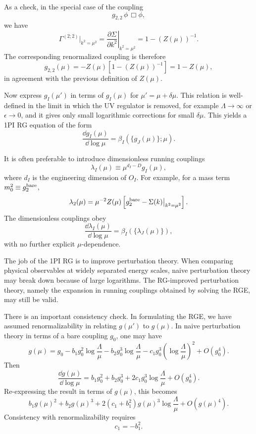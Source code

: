 As a check, in the special case of the coupling
\[
  g_{2,2}\,\phi\,\Box\phi,
\]
we have
\[
  \Gamma^{(2;2)}\big|_{k^2=\mu^2}
  =
  \left.\frac{\partial\Sigma}{\partial k^2}\right|_{k^2=\mu^2}
  =
  1-\left(Z(\mu)\right)^{-1}.
\]
The corresponding renormalized coupling is therefore
\[
  g_{2,2}(\mu)
  =
  -Z(\mu)\left[1-\left(Z(\mu)\right)^{-1}\right]
  =
  1-Z(\mu),
\]
in agreement with the previous definition of \(Z(\mu)\).

Now express \(g_I(\mu')\) in terms of \(g_I(\mu)\) for
\(\mu'=\mu+\delta\mu\).  This relation is well-defined in the limit in which
the UV regulator is removed, for example \(\Lambda\to\infty\) or
\(\epsilon\to0\), and it gives only small logarithmic corrections for small
\(\delta\mu\).  This yields a 1PI RG equation of the form
\[
  \frac{\dd g_I(\mu)}{\dd\log\mu}
  =
  \beta_I(\{g_J(\mu)\};\mu).
\]

It is often preferable to introduce dimensionless running couplings
\[
  \lambda_I(\mu)\equiv \mu^{d_I-D}g_I(\mu),
\]
where \(d_I\) is the engineering dimension of \(O_I\).  For example, for a
mass term \(m_0^2\equiv g_2^{\rm bare}\),
\[
  \lambda_2(\mu)
  =
  \mu^{-2}Z(\mu)
  \left[
    g_2^{\rm bare}-\Sigma(k)\big|_{k^2=\mu^2}
  \right].
\]
The dimensionless couplings obey
\[
  \frac{\dd\lambda_I(\mu)}{\dd\log\mu}
  =
  \beta_I(\{\lambda_J(\mu)\}),
\]
with no further explicit \(\mu\)-dependence.

The job of the 1PI RG is to improve perturbation theory.  When comparing
physical observables at widely separated energy scales, naive perturbation
theory may break down because of large logarithms.  The RG-improved
perturbation theory, namely the expansion in running couplings obtained by
solving the RGE, may still be valid.

There is an important consistency check.  In formulating the RGE, we have
assumed renormalizability in relating \(g(\mu')\) to \(g(\mu)\).  In naive
perturbation theory in terms of a bare coupling \(g_0\), one may have
\[
  g(\mu)
  =
  g_0
  -b_1g_0^2\log\frac{\Lambda}{\mu}
  -b_2g_0^3\log\frac{\Lambda}{\mu}
  -c_1g_0^3\left(\log\frac{\Lambda}{\mu}\right)^2
  +O(g_0^4).
\]
Then
\[
  \frac{\dd g(\mu)}{\dd\log\mu}
  =
  b_1g_0^2+b_2g_0^3
  +2c_1g_0^3\log\frac{\Lambda}{\mu}
  +O(g_0^4).
\]
Re-expressing the result in terms of \(g(\mu)\), this becomes
\[
  b_1g(\mu)^2+b_2g(\mu)^3
  +2\left(c_1+b_1^2\right)
  g(\mu)^3\log\frac{\Lambda}{\mu}
  +O(g(\mu)^4).
\]
Consistency with renormalizability requires
\[
  c_1=-b_1^2.
\]

